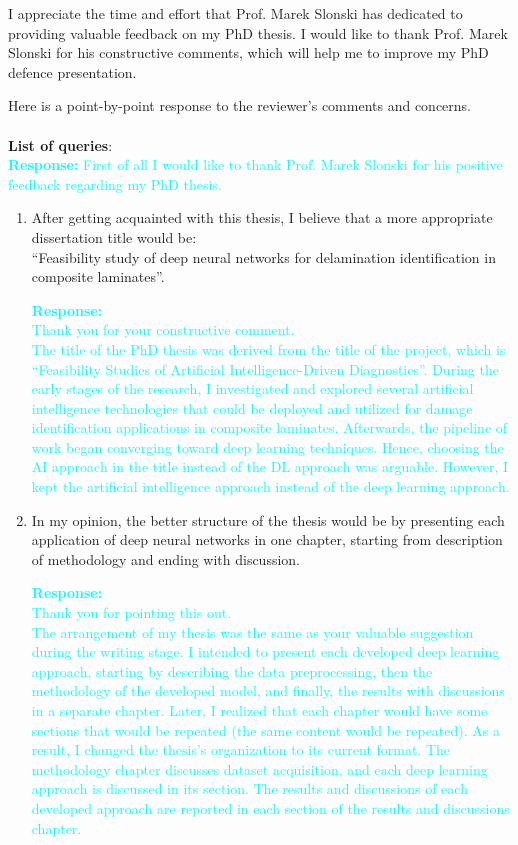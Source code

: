 \documentclass[11pt,a2paper]{report}
\begin{document}
	
	\noindent I appreciate the time and effort that Prof. Marek S{l}o{n}ski has dedicated to providing valuable feedback on my PhD thesis. 
	I would like to thank Prof. Marek S{l}o{n}ski for his constructive comments, which will help me to improve my PhD defence presentation. 
	
	\noindent Here is a point-by-point response to the reviewer’s comments and concerns.
	\\ \\
	\textbf{List of queries}: \\
	\textcolor{Cyan}{
		\newline\textbf{Response:}
		First of all I would like to thank Prof. Marek S{l}o{n}ski for his positive feedback regarding my PhD thesis.
	}
	\begin{enumerate}
		\item After getting acquainted with this thesis, I believe that a more appropriate dissertation title would be:\\ \enquote{Feasibility study of deep neural networks for delamination identification in composite laminates}.
		
		\textcolor{Cyan}{
			\textbf{Response:}
			\\
			Thank you for your constructive comment. \\
			The title of the PhD thesis was derived from the title of the project, which is \enquote{Feasibility Studies of Artificial Intelligence-Driven Diagnostics}. 
			During the early stages of the research, I investigated and explored several artificial intelligence technologies that could be deployed and utilized for damage identification applications in composite laminates.
			Afterwards, the pipeline of work began converging toward deep learning techniques.
			Hence, choosing the AI approach in the title instead of the DL approach was arguable.
			However, I kept the artificial intelligence approach instead of the deep learning approach.
		}
		\item In my opinion, the better structure of the thesis would be by presenting each application of deep neural networks in one chapter, starting from description of methodology and ending with discussion.
		
		\textcolor{Cyan}{
			\textbf{Response:\\}
			Thank you for pointing this out. \\
			The arrangement of my thesis was the same as your valuable suggestion during the writing stage.
			I intended to present each developed deep learning approach, starting by describing the data preprocessing, then the methodology of the developed model, and finally, the results with discussions in a separate chapter.
			Later, I realized that each chapter would have some sections that would be repeated (the same content would be repeated).
			As a result, I changed the thesis's organization to its current format.
			The methodology chapter discusses dataset acquisition, and each deep learning approach is discussed in its section.
			The results and discussions of each developed approach are reported in each section of the results and discussions chapter.
			}
		

\end{enumerate}
\end{document}

